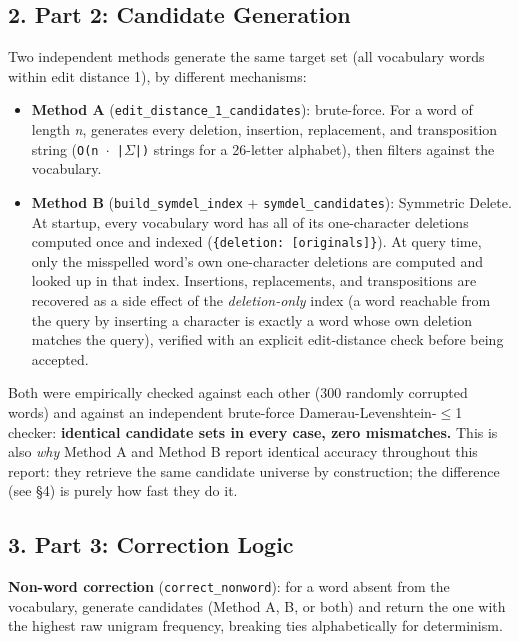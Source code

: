 \documentclass[11pt,a4paper]{article}
\begin{document}
\subsection*{2. Part 2: Candidate Generation}

Two independent methods generate the same target set (all vocabulary words within edit distance 1), by different mechanisms:

\begin{itemize}
\item \textbf{Method A} (\texttt{edit\_\allowbreak{}distance\_\allowbreak{}1\_\allowbreak{}candidates}): brute-force. For a word of length \textit{n}, generates every deletion, insertion, replacement, and transposition string (\texttt{O(n $\cdot$ |$\Sigma$|)} strings for a 26-letter alphabet), then filters against the vocabulary.
\item \textbf{Method B} (\texttt{build\_\allowbreak{}symdel\_\allowbreak{}index} + \texttt{symdel\_\allowbreak{}candidates}): Symmetric Delete. At startup, every vocabulary word has all of its one-character deletions computed once and indexed (\texttt{\{deletion: [originals]\}}). At query time, only the misspelled word's own one-character deletions are computed and looked up in that index. Insertions, replacements, and transpositions are recovered as a side effect of the \textit{deletion-only} index (a word reachable from the query by inserting a character is exactly a word whose own deletion matches the query), verified with an explicit edit-distance check before being accepted.
\end{itemize}

Both were empirically checked against each other (300 randomly corrupted words) and against an independent brute-force Damerau-Levenshtein-$\leq$1 checker: \textbf{identical candidate sets in every case, zero mismatches.} This is also \textit{why} Method A and Method B report identical accuracy throughout this report: they retrieve the same candidate universe by construction; the difference (see \S{}4) is purely how fast they do it.

\subsection*{3. Part 3: Correction Logic}

\textbf{Non-word correction} (\texttt{correct\_\allowbreak{}nonword}): for a word absent from the vocabulary, generate candidates (Method A, B, or both) and return the one with the highest raw unigram frequency, breaking ties alphabetically for determinism.
\end{document}

